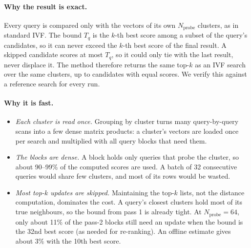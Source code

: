 \paragraph{Why the result is exact.} Every query is compared only with the
vectors of its own \(N_{\mathrm{probe}}\) clusters, as in standard IVF. The bound
\(T_q\) is the \(k\)-th best score among a subset of the query's candidates, so
it can never exceed the \(k\)-th best score of the final result. A skipped
candidate scores at most \(T_q\), so it could only tie with the last result,
never displace it. The method therefore returns the same top-\(k\) as an IVF
search over the same clusters, up to candidates with equal scores. We verify
this against a reference search for every run.

\paragraph{Why it is fast.}
\begin{itemize}
  \item \emph{Each cluster is read once.} Grouping by cluster turns many
    query-by-query scans into a few dense matrix products: a cluster's vectors
    are loaded once per search and multiplied with all query blocks that need
    them.
  \item \emph{The blocks are dense.} A block holds only queries that probe the
    cluster, so about 90--99\% of the computed scores are used. A batch of 32
    consecutive queries would share few clusters, and most of its rows would be
    wasted.
  \item \emph{Most top-\(k\) updates are skipped.} Maintaining the top-\(k\) lists,
    not the distance computation, dominates the cost. A query's closest
    clusters hold most of its true neighbours, so the bound from pass 1 is
    already tight. At \(N_{\mathrm{probe}}=64\), only about 11\% of the pass-2
    blocks still need an update when the bound is the 32nd best score (as
    needed for re-ranking). An offline estimate gives about 3\% with the 10th
    best score.
\end{itemize}

